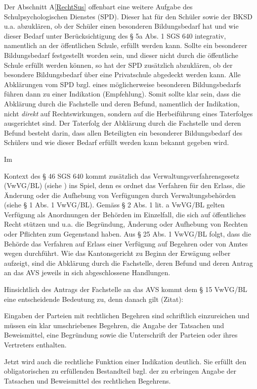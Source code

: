 \documentclass[10pt,parskip]{scrbook}
\newcounter{rz}
\newcommand{\Rz}{\addtocounter{rz}{1}\marginpar{\texttt{\textit{A\arabic{rz}}}}}
\newcommand{\RzLabel}[1]{\refstepcounter{rz}\label{#1}\marginpar{\texttt{\textit{A\arabic{rz}}}}}
\begin{document}
Der \RzLabel{AufgSPD} Abschnitt A\ref{RechtSus} offenbart eine weitere Aufgabe des Schulpsychologischen Dienstes (SPD). Dieser hat für den Schüler sowie der BKSD u.a. abzuklären, ob der Schüler einen besonderen Bildungsbedarf hat und wie dieser Bedarf unter Berücksichtigung des § 5a Abs. 1 SGS 640 integrativ, namentlich an der öffentlichen Schule, erfüllt werden kann. Sollte ein besonderer Bildungsbedarf festgestellt worden sein, und dieser nicht durch die öffentliche Schule erfüllt werden können, so hat der SPD zusätzlich abzuklären, ob der besondere Bildungsbedarf über eine Privatschule abgedeckt werden kann. Alle Abklärungen vom SPD bzgl. eines möglicherweise besonderen Bildungsbedarfs führen dann zu einer Indikation (Empfehlung). Somit sollte klar sein,  dass die Abklärung durch die Fachstelle und deren Befund, namentlich der Indikation, nicht \textit{direkt} auf Rechtswirkungen, sondern auf die Herbeiführung eines Taterfolges ausgerichtet sind. Der Taterfolg der Abklärung durch die Fachstelle und deren Befund besteht darin, dass allen Beteiligten ein besonderer Bildungsbedarf des Schülers und wie dieser Bedarf erfüllt werden kann bekannt gegeben wird.

Im \Rz Kontext des § 46 SGS 640 kommt zusätzlich das Verwaltungsverfahrensgesetz (VwVG/BL) (siehe \cite{SGS175}) ins Spiel, denn es ordnet das Verfahren für den Erlass, die Änderung oder die Aufhebung von Verfügungen durch Verwaltungsbehörden (siehe § 1 Abs. 1 VwVG/BL). Gemäss § 2 Abs. 1 lit. a VwVG/BL  gelten Verfügung als Anordnungen der Behörden im Einzelfall, die sich auf öffentliches Recht stützen und u.a. die Begründung, Änderung oder Aufhebung von Rechten oder Pflichten zum Gegenstand haben. Aus § 25 Abs. 1 VwVG/BL folgt, dass die Behörde das Verfahren auf Erlass einer Verfügung auf Begehren oder von Amtes wegen durchführt. Wie das Kantonsgericht zu Beginn der Erwägung selber aufzeigt, sind die Abklärung durch die Fachstelle, deren Befund und deren Antrag an das AVS jeweils in sich abgeschlossene Handlungen.

Hinsichtlich \RzLabel{AufgIndikation} des Antrags der Fachstelle an das AVS kommt dem § 15 VwVG/BL eine entscheidende Bedeutung zu, denn danach gilt (Zitat):
\begin{addmargin}[2.5em]{0em}Eingaben der Parteien mit rechtlichen Begehren sind schriftlich einzureichen und müssen ein klar umschriebenes Begehren, die Angabe der Tatsachen und Beweismittel, eine Begründung sowie die Unterschrift der Parteien oder ihres Vertreters enthalten.
\end{addmargin}
Jetzt wird auch die rechtliche Funktion einer Indikation deutlich. Sie erfüllt den obligatorischen zu erfüllenden Bestandteil bzgl. der zu erbringen Angabe der Tatsachen und Beweismittel des rechtlichen Begehrens. 
\end{document}
